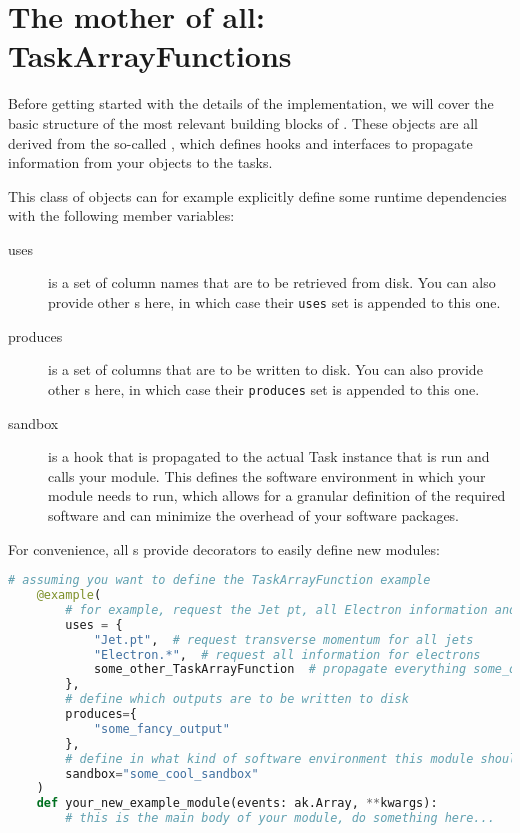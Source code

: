 \section{The mother of all: TaskArrayFunctions}\label{sec:taskarrayfunc}

Before getting started with the details of the implementation, we will cover the basic structure of the most relevant building blocks of \columnflow.
These objects are all derived from the so-called , which defines hooks and interfaces to propagate information from your objects to the \columnflow tasks.

This class of objects can for example explicitly define some runtime dependencies with the following member variables:
\begin{description}
	\item[uses] is a set of column names that are to be retrieved from disk.
	You can also provide other s here, in which case their \texttt{uses} set is appended to this one.
	\item[produces] is a set of columns that are to be written to disk.
	You can also provide other s here, in which case their \texttt{produces} set is appended to this one.
	\item[sandbox] is a hook that is propagated to the actual Task instance that is run and calls your module.
	This defines the software environment in which your module needs to run, which allows for a granular definition of the required software and can minimize the overhead of your software packages.
	
\end{description}

For convenience, all  s provide decorators to easily define new modules:

\begin{lstlisting}[language=python]
	# assuming you want to define the TaskArrayFunction example
	@example(
		# for example, request the Jet pt, all Electron information and everything another 
		uses = {
			"Jet.pt",  # request transverse momentum for all jets
			"Electron.*",  # request all information for electrons
			some_other_TaskArrayFunction  # propagate everything some_other_TaskArrayFunction needs to this example TaskArrayFunction
	    },
	    # define which outputs are to be written to disk
	    produces={
	    	"some_fancy_output"
	    },
	    # define in what kind of software environment this module should be run
	    sandbox="some_cool_sandbox"
	)
	def your_new_example_module(events: ak.Array, **kwargs):
	    # this is the main body of your module, do something here...
\end{lstlisting}

